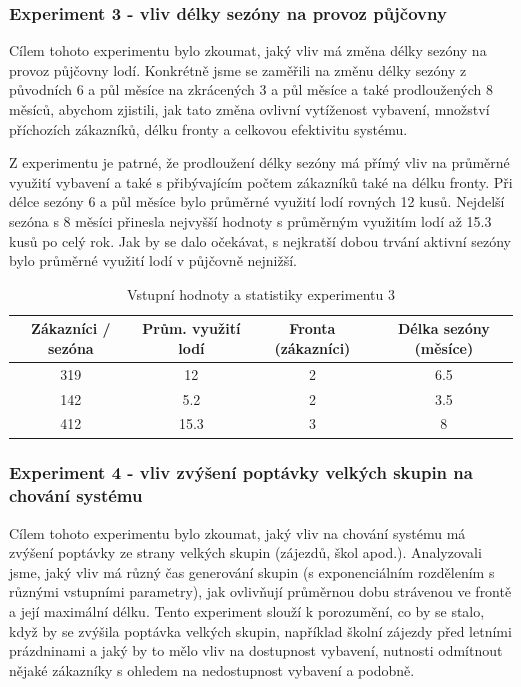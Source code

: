 \documentclass[a4paper, 12pt, hidelinks]{article}
\begin{document}
\subsubsection{Experiment 3 - vliv délky sezóny na provoz půjčovny}
Cílem tohoto experimentu bylo zkoumat, jaký vliv má změna délky sezóny na provoz půjčovny lodí. Konkrétně jsme se zaměřili na změnu délky sezóny z původních 6 a půl měsíce na zkrácených 3 a půl měsíce a také prodloužených 8 měsíců, abychom zjistili, jak tato změna ovlivní vytíženost vybavení, množství příchozích zákazníků, délku fronty a celkovou efektivitu systému.

Z experimentu je patrné, že prodloužení délky sezóny má přímý vliv na průměrné využití vybavení a také s přibývajícím počtem zákazníků také na délku fronty. Při délce sezóny 6 a půl měsíce bylo průměrné využití lodí rovných 12 kusů. Nejdelší sezóna s 8 měsíci přinesla nejvyšší hodnoty s průměrným využitím lodí až 15.3 kusů po celý rok. Jak by se dalo očekávat, s nejkratší dobou trvání aktivní sezóny bylo průměrné využití lodí v půjčovně nejnižší.

\begin{table}[h!]
    \centering
    \caption{Vstupní hodnoty a statistiky experimentu 3}
    \label{tab:simulation_stats3}
    \begin{tabular}{|c|c|c|c|}
        \hline
        \textbf{Zákazníci / sezóna} & \textbf{Prům. využití lodí} & \textbf{Fronta (zákazníci)} & \textbf{Délka sezóny (měsíce)} \\ \hline
        319 & 12 & 2 & 6.5 \\ \hline
        142 & 5.2 & 2 & 3.5\\ \hline
        412 & 15.3 & 3 & 8\\ \hline
    \end{tabular}
\end{table}

\subsubsection{Experiment 4 - vliv zvýšení poptávky velkých skupin na chování systému}
Cílem tohoto experimentu bylo zkoumat, jaký vliv na chování systému má zvýšení poptávky ze strany velkých skupin (zájezdů, škol apod.). Analyzovali jsme, jaký vliv má různý čas generování skupin (s exponenciálním rozdělením s různými vstupními parametry), jak ovlivňují průměrnou dobu strávenou ve frontě a její maximální délku. Tento experiment slouží k porozumění, co by se stalo, když by se zvýšila poptávka velkých skupin, například školní zájezdy před letními prázdninami a jaký by to mělo vliv na dostupnost vybavení, nutnosti odmítnout nějaké zákazníky s ohledem na nedostupnost vybavení a podobně.
\end{document}
